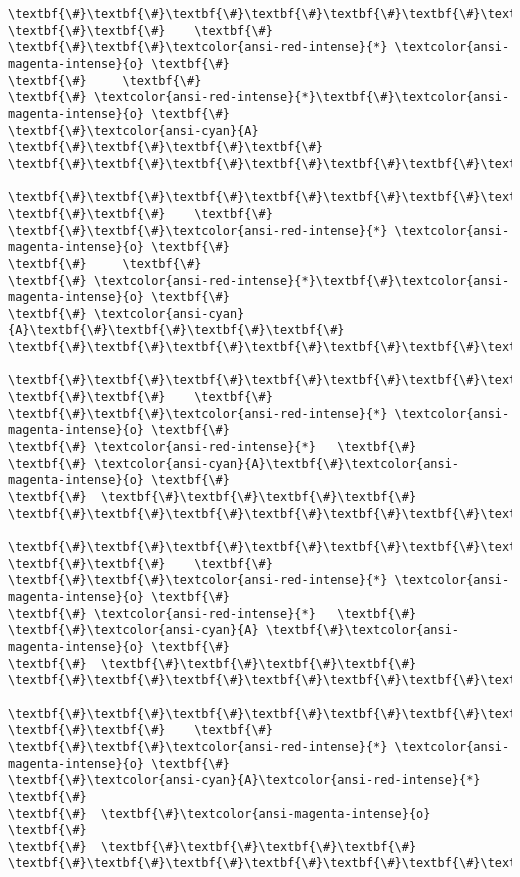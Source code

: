 \documentclass[11pt]{article}
\begin{document}
\begin{Verbatim}[commandchars=\\\{\}]
\textbf{\#}\textbf{\#}\textbf{\#}\textbf{\#}\textbf{\#}\textbf{\#}\textbf{\#}
\textbf{\#}\textbf{\#}    \textbf{\#}
\textbf{\#}\textbf{\#}\textcolor{ansi-red-intense}{*} \textcolor{ansi-magenta-intense}{o} \textbf{\#}
\textbf{\#}     \textbf{\#}
\textbf{\#} \textcolor{ansi-red-intense}{*}\textbf{\#}\textcolor{ansi-magenta-intense}{o} \textbf{\#}
\textbf{\#}\textcolor{ansi-cyan}{A} \textbf{\#}\textbf{\#}\textbf{\#}\textbf{\#}
\textbf{\#}\textbf{\#}\textbf{\#}\textbf{\#}\textbf{\#}\textbf{\#}\textbf{\#}

\textbf{\#}\textbf{\#}\textbf{\#}\textbf{\#}\textbf{\#}\textbf{\#}\textbf{\#}
\textbf{\#}\textbf{\#}    \textbf{\#}
\textbf{\#}\textbf{\#}\textcolor{ansi-red-intense}{*} \textcolor{ansi-magenta-intense}{o} \textbf{\#}
\textbf{\#}     \textbf{\#}
\textbf{\#} \textcolor{ansi-red-intense}{*}\textbf{\#}\textcolor{ansi-magenta-intense}{o} \textbf{\#}
\textbf{\#} \textcolor{ansi-cyan}{A}\textbf{\#}\textbf{\#}\textbf{\#}\textbf{\#}
\textbf{\#}\textbf{\#}\textbf{\#}\textbf{\#}\textbf{\#}\textbf{\#}\textbf{\#}

\textbf{\#}\textbf{\#}\textbf{\#}\textbf{\#}\textbf{\#}\textbf{\#}\textbf{\#}
\textbf{\#}\textbf{\#}    \textbf{\#}
\textbf{\#}\textbf{\#}\textcolor{ansi-red-intense}{*} \textcolor{ansi-magenta-intense}{o} \textbf{\#}
\textbf{\#} \textcolor{ansi-red-intense}{*}   \textbf{\#}
\textbf{\#} \textcolor{ansi-cyan}{A}\textbf{\#}\textcolor{ansi-magenta-intense}{o} \textbf{\#}
\textbf{\#}  \textbf{\#}\textbf{\#}\textbf{\#}\textbf{\#}
\textbf{\#}\textbf{\#}\textbf{\#}\textbf{\#}\textbf{\#}\textbf{\#}\textbf{\#}

\textbf{\#}\textbf{\#}\textbf{\#}\textbf{\#}\textbf{\#}\textbf{\#}\textbf{\#}
\textbf{\#}\textbf{\#}    \textbf{\#}
\textbf{\#}\textbf{\#}\textcolor{ansi-red-intense}{*} \textcolor{ansi-magenta-intense}{o} \textbf{\#}
\textbf{\#} \textcolor{ansi-red-intense}{*}   \textbf{\#}
\textbf{\#}\textcolor{ansi-cyan}{A} \textbf{\#}\textcolor{ansi-magenta-intense}{o} \textbf{\#}
\textbf{\#}  \textbf{\#}\textbf{\#}\textbf{\#}\textbf{\#}
\textbf{\#}\textbf{\#}\textbf{\#}\textbf{\#}\textbf{\#}\textbf{\#}\textbf{\#}

\textbf{\#}\textbf{\#}\textbf{\#}\textbf{\#}\textbf{\#}\textbf{\#}\textbf{\#}
\textbf{\#}\textbf{\#}    \textbf{\#}
\textbf{\#}\textbf{\#}\textcolor{ansi-red-intense}{*} \textcolor{ansi-magenta-intense}{o} \textbf{\#}
\textbf{\#}\textcolor{ansi-cyan}{A}\textcolor{ansi-red-intense}{*}   \textbf{\#}
\textbf{\#}  \textbf{\#}\textcolor{ansi-magenta-intense}{o} \textbf{\#}
\textbf{\#}  \textbf{\#}\textbf{\#}\textbf{\#}\textbf{\#}
\textbf{\#}\textbf{\#}\textbf{\#}\textbf{\#}\textbf{\#}\textbf{\#}\textbf{\#}


\end{Verbatim}
\end{document}
